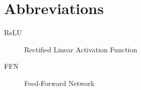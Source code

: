 \documentclass[\main/main.tex]{subfiles}
\begin{document}
\chapter*{Abbreviations}

\begin{description}
    \item[ReLU] Rectified Linear Activation Function
    \item[FFN] Feed-Forward Network
\end{description}
\end{document}

